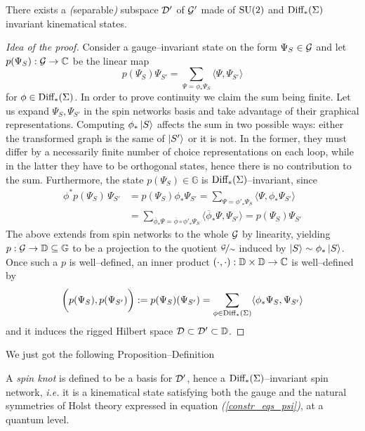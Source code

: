 \begin{teo}
    There exists a \emph{(}separable\emph{)} subspace $\mathcal{D}'$ of $\mathcal{G}'$ made of $\text{\normalfont SU}(2)$ and $\text{\normalfont Diff}_*(\Sigma)$ invariant kinematical states.
\end{teo}
\begin{proof}[Idea of the proof]
    Consider a gauge--invariant state on the form $\Psi_S\in\mathcal{G}$ and let $p(\Psi_S):\mathcal{G}\to\mathbb{C}$ be the linear map
    $$p(\Psi_S)\Psi_{S'}=\sum_{\Psi=\phi_*\Psi_S}\langle\Psi,\Psi_{S'}\rangle$$
    for $\phi\in\text{\normalfont Diff}_*(\Sigma)$. In order to prove continuity we claim the sum being finite. Let us expand $\Psi_S,\Psi_{S'}$ in the spin networks basis and take advantage of their graphical representations. Computing $\phi_*\left| S \right >$ affects the sum in two possible ways: either the transformed graph is the same of $\left| S' \right >$ or it is not. In the former, they must differ by a necessarily finite number of choice representations on each loop, while in the latter they have to be orthogonal states, hence there is no contribution to the sum. Furthermore, the state $p(\Psi_S)\in\mathbb{G}$ is $\text{\normalfont Diff}_*(\Sigma)$--invariant, since
    \begin{align*}
        \phi^*p(\Psi_S)\,\Psi_{S'}&=p(\Psi_S)\phi_*\Psi_{S'}=\sum_{\Psi={\phi'}_*\Psi_S}\langle\Psi,\phi_*\Psi_{S'}\rangle\\
        &=\sum_{\overline{\phi}_*\Psi=\overline{\phi}\circ{\phi'}_*\Psi_S}\langle\overline{\phi}_*\Psi,\Psi_{S'}\rangle=p(\Psi_S)\Psi_{S'}
    \end{align*}
    The above extends from spin networks to the whole $\mathcal{G}$ by linearity, yielding $p:\mathcal{G}\to\mathbb{D}\subseteq\mathbb{G}$ to be a projection to the quotient $\nicefrac{\mathcal{G}}{\sim}$ induced by $\left| S \right >\sim\phi_*\left| S \right >$. Once such a $p$ is well--defined, an inner product $(\cdot,\cdot):\mathbb{D}\times\mathbb{D}\to\mathbb{C}$ is well--defined by
\begin{equation}
    \bigg(p(\Psi_S),p(\Psi_{S'})\bigg):=p(\Psi_S)(\Psi_{S'})=\sum_{\phi\in\text{\normalfont Diff}_*(\Sigma)}\langle\phi_*\Psi_S,\Psi_{S'}\rangle
\end{equation}
and it induces the rigged Hilbert space $\mathcal{D}\subset{\mathcal{D}}'\subset\mathbb{D}$.
\end{proof}
We just got the following Proposition--Definition

\begin{defi}
    A \emph{spin knot} is defined to be a basis for $\mathcal{D}'$, hence a $\text{\normalfont Diff}_*(\Sigma)$--invariant spin network, \emph{i.e.} it is a kinematical state satisfying both the gauge and the natural symmetries of Holst theory expressed in equation \emph{(\ref{constr_eqs_psi})}, at a quantum level.
\end{defi}

